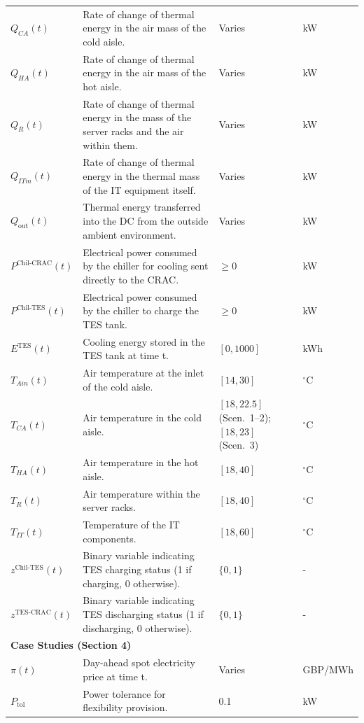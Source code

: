 \documentclass[lettersize,journal]{IEEEtran}
\newcommand{\rev}[1]{\textcolor{blue!70!black}{#1}}
\begin{document}
{{\begin{longtable}{p{} p{} p{} p{}}
$Q_{CA}(t)$ & Rate of change of thermal energy in the air mass of the cold aisle. & Varies &kW \\
$Q_{HA}(t)$ & Rate of change of thermal energy in the air mass of the hot aisle. & Varies &kW \\
$Q_{R}(t)$ & Rate of change of thermal energy in the mass of the server racks and the air within them. & Varies &kW \\
$Q_{ITm}(t)$ & Rate of change of thermal energy in the thermal mass of the IT equipment itself. & Varies &kW \\
$Q_{\mathrm{out}}(t)$ & Thermal energy transferred into the DC from the outside ambient environment. & Varies &kW \\
$P^{\mathrm{Chil}\text{-}\mathrm{CRAC}}(t)$ & Electrical power consumed by the chiller for cooling sent directly to the CRAC. & $\geq 0$ &kW \\
$P^{\mathrm{Chil}\text{-}\mathrm{TES}}(t)$ & Electrical power consumed by the chiller to charge the TES tank. & $\geq 0$ &kW \\
$E^{\mathrm{TES}}(t)$ & Cooling energy stored in the TES tank at time t. & $[0, 1000]$ &kWh \\
$T_{Ain}(t)$ & Air temperature at the inlet of the cold aisle. & $[14, 30]$ & $^{\circ}$C \\
$T_{CA}(t)$ & Air temperature in the cold aisle. & \rev{$[18, 22.5]$ (Scen.~1--2); $[18, 23]$ (Scen.~3)} & $^{\circ}$C \\
$T_{HA}(t)$ & Air temperature in the hot aisle. & $[18, 40]$ & $^{\circ}$C \\
$T_{R}(t)$ & Air temperature within the server racks. & $[18, 40]$ & $^{\circ}$C \\
$T_{IT}(t)$ & Temperature of the IT components. & $[18, 60]$ & $^{\circ}$C \\
$z^{\mathrm{Chil}\text{-}\mathrm{TES}}(t)$ & Binary variable indicating TES charging status (1 if charging, 0 otherwise). & $\{0, 1\}$ & - \\
$z^{\mathrm{TES}\text{-}\mathrm{CRAC}}(t)$ & Binary variable indicating TES discharging status (1 if discharging, 0 otherwise). & $\{0, 1\}$ & - \\
\midrule
\multicolumn{4}{l}{\textbf{Case Studies (Section 4)}} \\
\midrule
$\pi(t)$ & Day-ahead spot electricity price at time t. & Varies & GBP/MWh \\
$P_{\mathrm{tol}}$ & Power tolerance for flexibility provision. & 0.1 &kW \\

\end{longtable}}}
\end{document}
